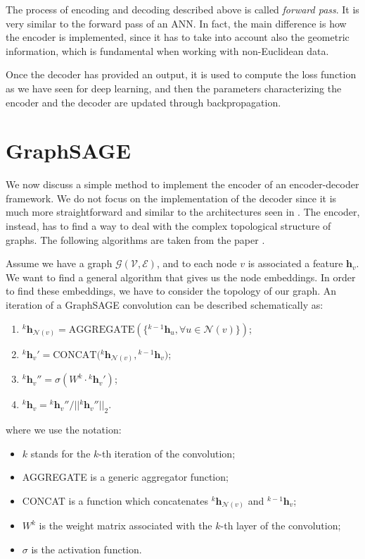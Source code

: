 \documentclass[12pt,a4paper]{report}
\theoremstyle{definition}
\begin{document}
The process of encoding and decoding described above is called \emph{forward pass}.
It is very similar to the forward pass of an ANN.
In fact, the main difference is how the encoder is implemented, since it has to take into account also the geometric information, which is fundamental when working with non-Euclidean data.

Once the decoder has provided an output, it is used to compute the loss function as we have seen for deep learning, and then the parameters characterizing the encoder and the decoder are updated through backpropagation. 

\section{GraphSAGE}
\label{sec:graphsage}

We now discuss a simple method to implement the encoder of an encoder-decoder framework.
We do not focus on the implementation of the decoder since it is much more straightforward and similar to the architectures seen in .
The encoder, instead, has to find a way to deal with the complex topological structure of graphs.
The following algorithms are taken from the paper \cite{graphsage}.

Assume we have a graph $\mathcal{G}(\mathcal{V}, \mathcal{E})$, and to each node $v$ is associated a feature $\mathbf{h}_v$.
We want to find a general algorithm that gives us the node embeddings.
In order to find these embeddings, we have to consider the topology of our graph.
An iteration of a GraphSAGE convolution can be described schematically as:
\begin{enumerate}
    \item ${^k \mathbf{h}_{\mathcal{N}(v)}} = \text{AGGREGATE}(\{ {^{k-1}\mathbf{h}_u} , \forall u \in \mathcal{N}(v) \} )$;
    \item $ ^k \mathbf{h}_v ' = \text{CONCAT}({^k \mathbf{h}_{\mathcal{N}(v)}},  { ^{k-1} \mathbf{h}_v)}$;
    \item $^k \mathbf{h}_v '' = \sigma (W^k \cdot {^k\mathbf{h}_v '}) $;
    \item $^k \mathbf{h}_v  = {^k \mathbf{h}_v ''}/||{^k \mathbf{h}_v ''}||_2$.
\end{enumerate}
where we use the notation:
\begin{itemize}
    \item $k$ stands for the $k$-th iteration of the convolution;
    \item AGGREGATE is a generic aggregator function;
    \item CONCAT is a function which concatenates ${^k \mathbf{h}_{\mathcal{N}(v)}}$ and ${ ^{k-1} \mathbf{h}_v}$;
    \item $W^k$ is the weight matrix associated with the $k$-th layer of the convolution;
    \item $\sigma$ is the activation function.
\end{itemize}
\end{document}
